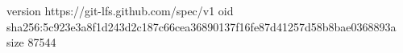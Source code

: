 version https://git-lfs.github.com/spec/v1
oid sha256:5c923e3a8f1d243d2c187c66cea36890137f16fe87d41257d58b8bae0368893a
size 87544
